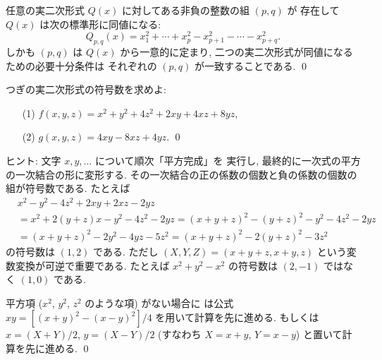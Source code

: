 \documentclass[12pt,twoside]{jarticle}
\begin{document}
\begin{theorem}
  任意の実二次形式 $Q(x)$ に対してある非負の整数の組 $(p,q)$ が
  存在して $Q(x)$ は次の標準形に同値になる:
  \begin{equation*}
    Q_{p,q}(x) = x_1^2 + \cdots + x_p^2 - x_{p+1}^2 - \cdots - x_{p+q}^2.
  \end{equation*}
  しかも $(p,q)$ は $Q(x)$ から一意的に定まり, 
  二つの実二次形式が同値になるための必要十分条件は
  それぞれの $(p,q)$ が一致することである.
  \qed
\end{theorem}

\begin{question}[10点]
\label{q:Sylvester-1}
  つぎの実二次形式の符号数を求めよ:
  \begin{itemize}
  \item[(1)] $f(x,y,z) = x^2 + y^2 + 4z^2 + 2xy + 4xz + 8yz$,
  \item[(2)] $g(x,y,z) = 4xy - 8xz + 4yz$.
    \qed
  \end{itemize}
\end{question}

\medskip\noindent
ヒント: 文字 $x,y,\ldots$ について順次「平方完成」を
実行し, 最終的に一次式の平方の一次結合の形に変形する.
その一次結合の正の係数の個数と負の係数の個数の組が符号数である.
たとえば 
\begin{align*}
  &
  x^2 - y^2 - 4z^2 + 2xy + 2xz - 2yz
  \\ &
  = x^2 + 2(y+z)x - y^2 - 4z^2 - 2yz
  = (x+y+z)^2 - (y+z)^2 - y^2 - 4z^2 - 2yz
  \\ &
  = (x+y+z)^2 - 2y^2 - 4yz - 5z^2
  = (x+y+z)^2 - 2(y+z)^2 - 3z^2
\end{align*}
の符号数は $(1,2)$ である.
ただし $(X,Y,Z)=(x+y+z, x+y, z)$ という変数変換が可逆で重要である.
たとえば $x^2 + y^2 - x^2$ の符号数は $(2,-1)$ ではなく $(1,0)$ である.

平方項 ($x^2$, $y^2$, $z^2$ のような項) がない場合に
は公式 $xy = [(x+y)^2 - (x-y)^2]/4$ を用いて計算を先に進める.
もしくは $x=(X+Y)/2$, $y=(X-Y)/2$ 
(すなわち $X=x+y$, $Y=x-y$) と置いて計算を先に進める. \qed
\end{document}
